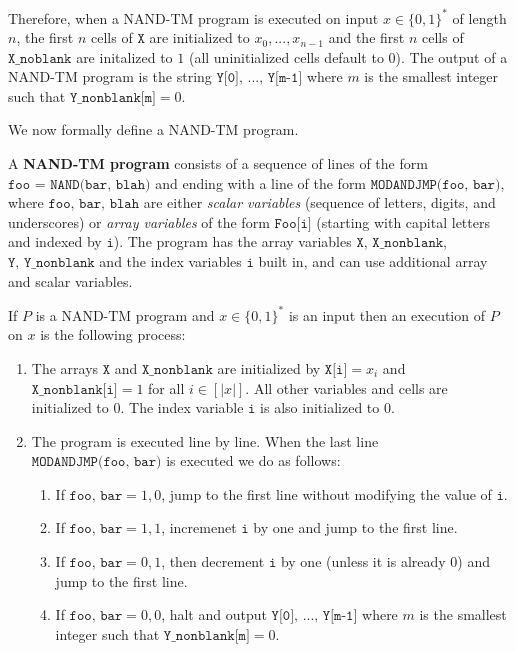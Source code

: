 \begin{enumerate}
  \end{enumerate}
  Therefore, when a NAND-TM program is executed on input $x \in \{0,1\}^*$ of length $n$, the first $n$ cells of $\texttt{X}$ are initialized to $x_0, ..., x_{n-1}$ and the first $n$ cells of $\texttt{X\_noblank}$ are initalized to $1$ (all uninitialized cells default to $0$). The output of a NAND-TM program is the string $\texttt{Y[0], ..., Y[m-1]}$ where $m$ is the smallest integer such that $\texttt{Y\_nonblank[m]} = 0$. 

  We now formally define a NAND-TM program. 

  \begin{definition}
  A \textbf{NAND-TM program} consists of a sequence of lines of the form $\texttt{foo = NAND(bar, blah)}$ and ending with a line of the form $\texttt{MODANDJMP(foo, bar)}$, where $\texttt{foo, bar, blah}$ are either \textit{scalar variables} (sequence of letters, digits, and underscores) or \textit{array variables} of the form $\texttt{Foo[i]}$ (starting with capital letters and indexed by $\texttt{i}$). The program has the array variables $\texttt{X, X\_nonblank}$, $\texttt{Y, Y\_nonblank}$ and the index variables $\texttt{i}$ built in, and can use additional array and scalar variables. 

  If $P$ is a NAND-TM program and $x \in \{0,1\}^*$ is an input then an execution of $P$ on $x$ is the following process: 
  \begin{enumerate}
      \item The arrays $\texttt{X}$ and $\texttt{X\_nonblank}$ are initialized by $\texttt{X[i]} = x_i$ and $\texttt{X\_nonblank[i]} = 1$ for all $i \in [|x|]$. All other variables and cells are initialized to $0$. The index variable $\texttt{i}$ is also initialized to $0$. 
      \item The program is executed line by line. When the last line $\texttt{MODANDJMP(foo, bar)}$ is executed we do as follows: 
      \begin{enumerate}
          \item If $\texttt{foo, bar} = 1, 0$, jump to the first line without modifying the value of $\texttt{i}$. 
          \item If $\texttt{foo, bar} = 1, 1$, incremenet $\texttt{i}$ by one and jump to the first line. 
          \item If $\texttt{foo, bar} = 0, 1 $, then decrement $\texttt{i}$ by one (unless it is already 0) and jump to the first line. 
          \item If $\texttt{foo, bar} = 0, 0$, halt and output $\texttt{Y[0], ..., Y[m-1]}$ where $m$ is the smallest integer such that $\texttt{Y\_nonblank[m]} = 0$. 
      \end{enumerate}
  \end{enumerate}
  \end{definition}

